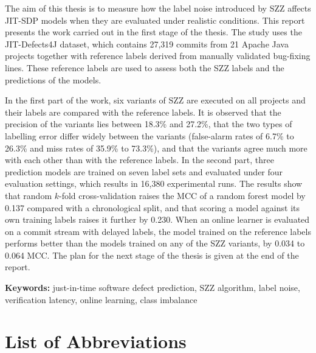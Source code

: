\documentclass[12pt,a4paper,oneside]{report}
\begin{document}
The aim of this thesis is to measure how the label noise introduced by SZZ
affects JIT-SDP models when they are evaluated under realistic conditions. This
report presents the work carried out in the first stage of the thesis. The study
uses the JIT-Defects4J dataset, which contains 27,319 commits from 21 Apache
Java projects together with reference labels derived from manually validated
bug-fixing lines. These reference labels are used to assess both the SZZ labels
and the predictions of the models.

In the first part of the work, six variants of SZZ are executed on all projects
and their labels are compared with the reference labels. It is observed that the
precision of the variants lies between 18.3\% and 27.2\%, that the two types of
labelling error differ widely between the variants (false-alarm rates of
6.7\% to 26.3\% and miss rates of 35.9\% to 73.3\%), and that the variants
agree much more with each other than with the reference labels. In the second
part, three prediction models are trained on seven label sets and evaluated
under four evaluation settings, which results in 16,380 experimental runs. The
results show that random $k$-fold cross-validation raises the MCC of a random
forest model by 0.137 compared with a chronological split, and that scoring a
model against its own training labels raises it further by 0.230. When an online
learner is evaluated on a commit stream with delayed labels, the model trained
on the reference labels performs better than the models trained on any of the
SZZ variants, by 0.034 to 0.064 MCC. The plan for the next stage of the thesis
is given at the end of the report.

\vspace{0.5em}
\noindent\textbf{Keywords:} just-in-time software defect prediction, SZZ
algorithm, label noise, verification latency, online learning, class imbalance

{\singlespacing
\tableofcontents
\listoffigures
\listoftables
}

\chapter*{List of Abbreviations}
\end{document}
